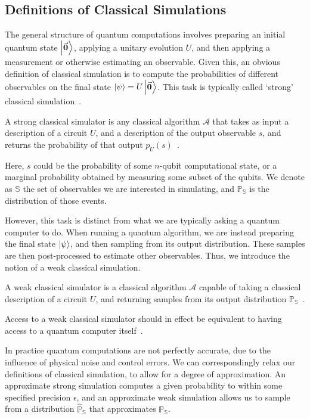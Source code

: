 \subsection{Definitions of Classical Simulations}\label{sec:intro_simulation_types}
The general structure of quantum computations involves preparing an initial quantum state $\ket{\va{0}}$, applying a unitary evolution $U$, and then applying a measurement or otherwise estimating an observable. Given this, an obvious definition of classical simulation is to compute the probabilities of different observables on the final state $\ket{\psi}=U\ket{\va{0}}$. This task is typically called `strong' classical simulation~\cite{VandenNest2008}.
\begin{defn}\label{def:strong_simulation}
A strong classical simulator is any classical algorithm $\mathcal{A}$ that takes as input a description of a circuit $U$, and a description of the output observable $s$, and returns the probability of that output $p_{U}\left(s\right)$~\cite{VandenNest2008}.
\end{defn}
Here, $s$ could be the probability of some $n$-qubit computational state, or a marginal probability obtained by measuring some subset of the qubits. We denote as $\mathbb{S}$ the set of observables we are interested in simulating, and $\mathbb{P}_{\mathbb{S}}$ is the distribution of those events.\par
However, this task is distinct from what we are typically asking a quantum computer to do. When running a quantum algorithm, we are instead preparing the final state $\ket{\psi}$, and then sampling from its output distribution. These samples are then post-processed to estimate other observables. Thus, we introduce the notion of a weak classical simulation.
\begin{defn}\label{def:weak_simulation}
A weak classical simulator is a classical algorithm $\mathcal{A}$ capable of taking a classical description of a circuit $U$, and returning samples from its output distribution $\mathbb{P}_{\mathbb{S}}$~\cite{VandenNest2008}.
\end{defn}
Access to a weak classical simulator should in effect be equivalent to having access to a quantum computer itself~\cite{Pashayan2017}.\par
In practice quantum computations are not perfectly accurate, due to the influence of physical noise and control errors. We can correspondingly relax our definitions of classical simulation, to allow for a degree of approximation. An approximate strong simulation computes a given probability to within some specified precision $\epsilon$, and an approximate weak simulation allows us to sample from a distribution $\mathbb{\hat{P}}_{\mathbb{S}}$ that approximates $\mathbb{P}_{\mathbb{S}}$.\par

